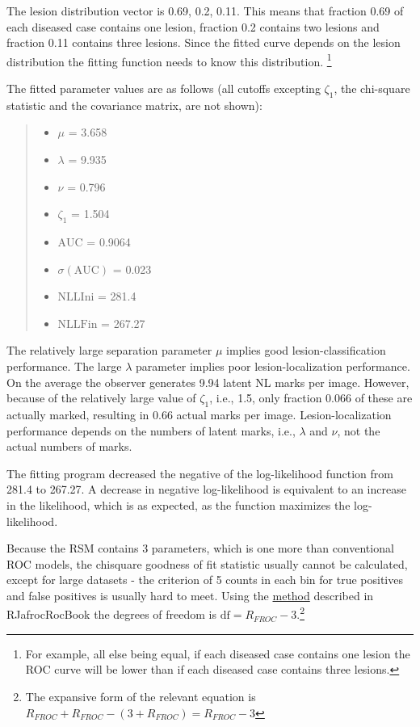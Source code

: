 \documentclass[
]{book}
\providecommand{\tightlist}{%
  \setlength{\itemsep}{0pt}\setlength{\parskip}{0pt}}
\begin{document}
The lesion distribution vector is 0.69, 0.2, 0.11. This means that fraction 0.69 of each diseased case contains one lesion, fraction 0.2 contains two lesions and fraction 0.11 contains three lesions. Since the fitted curve depends on the lesion distribution the fitting function needs to know this distribution. \footnote{For example, all else being equal, if each diseased case contains one lesion the ROC curve will be lower than if each diseased case contains three lesions.}

The fitted parameter values are as follows (all cutoffs excepting \(\zeta_1\), the chi-square statistic and the covariance matrix, are not shown):

\begin{quote}
\begin{itemize}
\tightlist
\item
  \(\mu\) = 3.658
\item
  \(\lambda\) = 9.935
\item
  \(\nu\) = 0.796
\item
  \(\zeta_1\) = 1.504
\item
  \(\text{AUC}\) = 0.9064
\item
  \(\sigma (\text{AUC})\) = 0.023
\item
  \(\text{NLLIni}\) = 281.4
\item
  \(\text{NLLFin}\) = 267.27
\end{itemize}
\end{quote}

The relatively large separation parameter \(\mu\) implies good lesion-classification performance. The large \(\lambda\) parameter implies poor lesion-localization performance. On the average the observer generates 9.94 latent NL marks per image. However, because of the relatively large value of \(\zeta_1\), i.e., 1.5, only fraction 0.066 of these are actually marked, resulting in 0.66 actual marks per image. Lesion-localization performance depends on the numbers of latent marks, i.e., \(\lambda\) and \(\nu\), not the actual numbers of marks.

The fitting program decreased the negative of the log-likelihood function from 281.4 to 267.27. A decrease in negative log-likelihood is equivalent to an increase in the likelihood, which is as expected, as the function maximizes the log-likelihood.

Because the RSM contains 3 parameters, which is one more than conventional ROC models, the chisquare goodness of fit statistic usually cannot be calculated, except for large datasets - the criterion of 5 counts in each bin for true positives and false positives is usually hard to meet. Using the \href{https://dpc10ster.github.io/RJafrocRocBook/binormal-model.html\#binormal-model-curve-fitting-validation-appendix-5}{method} described in RJafrocRocBook the degrees of freedom is \(\text{df} = R_{FROC} - 3\).\footnote{The expansive form of the relevant equation is \(R_{FROC} + R_{FROC} - (3 + R_{FROC}) = R_{FROC} - 3\)}
\end{document}
